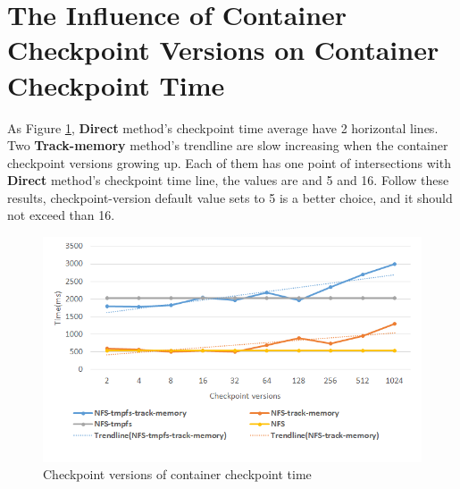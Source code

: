 \section{The Influence of Container Checkpoint Versions on Container Checkpoint Time}
As Figure \ref{fig:versions}, \textbf{Direct} method's checkpoint time average have 2 horizontal lines.
Two \textbf{Track-memory} method's trendline are slow increasing when the container checkpoint versions growing up.
Each of them has one point of intersections with \textbf{Direct} method's checkpoint time line, the values are and 5 and 16.
Follow these results, checkpoint-version default value sets to 5 is a better choice, and it should not exceed than 16.

\begin{figure}[htbp]
\begin{center}
\includegraphics[width=14cm]{figure/versions.png}
\end{center}
\caption{Checkpoint versions of container checkpoint time}
\label{fig:versions}
\end{figure}
